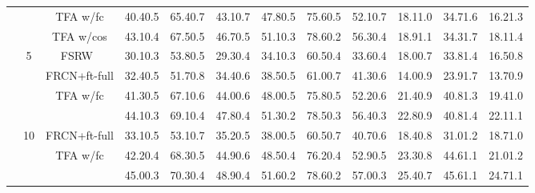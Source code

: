 \documentclass{article}
\newcommand{\model}{TFA\xspace}
\begin{document}
\begin{table*}[!h]
{\begin{tabular}{c|c|c|ccc|ccc|ccc}
    & &{\model w/fc} & 40.40.5 & 65.40.7 & 43.10.7 & 47.80.5 & 75.60.5 & 52.10.7 & 18.11.0 & 34.71.6 & 16.21.3  \\
    & &\cellcolor{Gray} {\model w/cos} &\cellcolor{Gray} 43.10.4 & \cellcolor{Gray}67.50.5 & \cellcolor{Gray}46.70.5 & \cellcolor{Gray}51.10.3 &\cellcolor{Gray} 78.60.2 &\cellcolor{Gray} 56.30.4 & \cellcolor{Gray}18.91.1 &\cellcolor{Gray} 34.31.7 &\cellcolor{Gray} 18.11.4  \\ \cmidrule{2-12}
    & \multirow{4}{*}{5} & FSRW~\cite{kang2019few} & 
    30.10.3&53.80.5&29.30.4&34.10.3&60.50.4&33.60.4&18.00.7&33.81.4&16.50.8 \\
    & & FRCN+ft-full & 32.40.5 & 51.70.8 & 34.40.6 & 38.50.5 & 61.00.7 & 41.30.6 & 14.00.9 & 23.91.7 & 13.70.9 \\
    & & {\model w/fc} & 41.30.5 & 67.10.6 & 44.00.6 & 48.00.5 & 75.80.5 & 52.20.6 & 21.40.9 & 40.81.3 & 19.41.0  \\
    & & \cellcolor{Gray}{\model w/cos} & \cellcolor{Gray}44.10.3 &\cellcolor{Gray} 69.10.4 & \cellcolor{Gray}47.80.4 & \cellcolor{Gray}51.30.2 & \cellcolor{Gray}78.50.3 & \cellcolor{Gray}56.40.3 & \cellcolor{Gray}22.80.9 & \cellcolor{Gray}40.81.4 & \cellcolor{Gray}22.11.1  \\ \cmidrule{2-12}
    & \multirow{3}{*}{10} & FRCN+ft-full & 33.10.5 & 53.10.7 & 35.20.5 & 38.00.5 & 60.50.7 & 40.70.6 & 18.40.8 & 31.01.2 & 18.71.0 \\
    & & {\model w/fc} & 42.20.4 & 68.30.5 & 44.90.6 & 48.50.4 & 76.20.4 & 52.90.5 & 23.30.8 & 44.61.1 & 21.01.2  \\
    & & \cellcolor{Gray}{\model w/cos} & \cellcolor{Gray}45.00.3 & \cellcolor{Gray}70.30.4 &\cellcolor{Gray} 48.90.4 &\cellcolor{Gray} 51.60.2 &\cellcolor{Gray} 78.60.2 &\cellcolor{Gray} 57.00.3 & \cellcolor{Gray}25.40.7 & \cellcolor{Gray}45.61.1 & \cellcolor{Gray}24.71.1  \\
\bottomrule
\end{tabular}}
\label{tab:voc_bench}
\end{table*}
\end{document}
